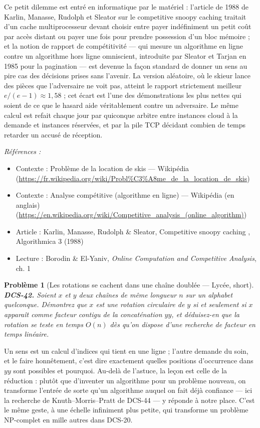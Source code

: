 \documentclass[11pt]{article}
\newtheorem{problem}{Problème}
\newenvironment{refs}{\par\small\noindent\emph{Références :}\begin{itemize}\setlength\itemsep{0pt}}{\end{itemize}\normalsize}
\begin{document}
\noindent Ce petit dilemme est entré en informatique par le matériel : l'article de 1988 de Karlin, Manasse, Rudolph et Sleator sur le \og{} competitive snoopy caching \fg{} traitait d'un cache multiprocesseur devant choisir entre payer indéfiniment un petit coût par accès distant ou payer une fois pour prendre possession d'un bloc mémoire ; et la notion de rapport de compétitivité --- qui mesure un algorithme en ligne contre un algorithme hors ligne omniscient, introduite par Sleator et Tarjan en 1985 pour la pagination --- est devenue la façon standard de donner un sens au pire cas des décisions prises sans l'avenir. La version aléatoire, où le skieur lance des pièces que l'adversaire ne voit pas, atteint le rapport strictement meilleur $ e/(e-1) \approx 1{,}58 $ ; cet écart est l'une des démonstrations les plus nettes qui soient de ce que le hasard aide véritablement contre un adversaire. Le même calcul est refait chaque jour par quiconque arbitre entre instances cloud à la demande et instances réservées, et par la pile TCP décidant combien de temps retarder un accusé de réception.

\begin{refs}
\item Contexte : Problème de la location de skis --- Wikipédia (\url{https://fr.wikipedia.org/wiki/Probl%C3%A8me_de_la_location_de_skis})
\item Contexte : Analyse compétitive (algorithme en ligne) --- Wikipédia (en anglais) (\url{https://en.wikipedia.org/wiki/Competitive_analysis_(online_algorithm)})
\item Article : Karlin, Manasse, Rudolph \& Sleator, \og{} Competitive snoopy caching \fg{}, Algorithmica 3 (1988)
\item Lecture : Borodin \& El-Yaniv, \textit{Online Computation and Competitive Analysis}, ch. 1
\end{refs}

\bigskip

\begin{problem}[{Les rotations se cachent dans une chaîne doublée --- Lycée, short}]
\textbf{DCS-42.} Soient $ x $ et $ y $ deux chaînes de même longueur $ n $ sur un alphabet quelconque. Démontrez que $ x $ est une rotation circulaire de $ y $ si et seulement si $ x $ apparaît comme facteur contigu de la concaténation $ yy $, et déduisez-en que la rotation se teste en temps $ O(n) $ dès qu'on dispose d'une recherche de facteur en temps linéaire.
\end{problem}

\noindent Un sens est un calcul d'indices qui tient en une ligne ; l'autre demande du soin, et le faire honnêtement, c'est dire exactement quelles positions d'occurrence dans $ yy $ sont possibles et pourquoi. Au-delà de l'astuce, la leçon est celle de la réduction : plutôt que d'inventer un algorithme pour un problème nouveau, on transforme l'entrée de sorte qu'un algorithme auquel on fait déjà confiance --- ici la recherche de Knuth--Morris--Pratt de DCS-44 --- y réponde à notre place. C'est le même geste, à une échelle infiniment plus petite, qui transforme un problème NP-complet en mille autres dans DCS-20.
\end{document}
